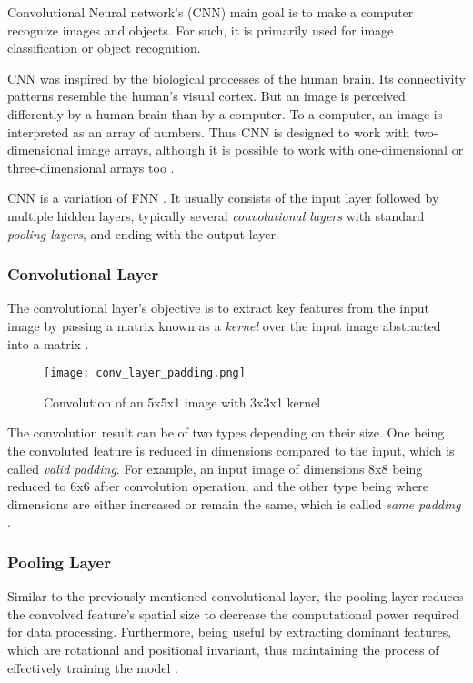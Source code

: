 Convolutional Neural network's (CNN) main goal is to make a computer recognize images and objects. For such, it is primarily used for image classification or object recognition.

CNN was inspired by the biological processes of the human brain. Its connectivity patterns resemble the human's visual cortex. But an image is perceived differently by a human brain than by a computer. To a computer, an image is interpreted as an array of numbers. Thus CNN is designed to work with two-dimensional image arrays, although it is possible to work with one-dimensional or three-dimensional arrays too \cite{mlmastery}.

CNN is a variation of FNN \cite{Goodfellow-et-al-2016}. It usually consists of the input layer followed by multiple hidden layers, typically several \textit{convolutional layers} with standard \textit{pooling layers}, and ending with the output layer. 

\subsubsection{Convolutional Layer}

The convolutional layer's objective is to extract key features from the input image by passing a matrix known as a \textit{kernel} over the input image abstracted into a matrix \cite{mathworkscnn}.

\begin{figure}[h]
	\centering
    \texttt{[image: conv\_layer\_padding.png]}
	\caption{Convolution of an 5x5x1 image with 3x3x1 kernel \cite{compguideCnn}}
	\label{fig:cnn_conv}
\end{figure}


The convolution result can be of two types depending on their size. One being the convoluted feature is reduced in dimensions compared to the input, which is called \textit{valid padding}. For example, an input image of dimensions 8x8 being reduced to 6x6 after convolution operation, and the other type being where dimensions are either increased or remain the same, which is called \textit{same padding} \cite{compguideCnn}.

\subsubsection{Pooling Layer}


Similar to the previously mentioned convolutional layer, the pooling layer reduces the convolved feature's spatial size to decrease the computational power required for data processing. Furthermore, being useful by extracting dominant features, which are rotational and positional invariant, thus maintaining the process of effectively training the model \cite{compguideCnn}.


